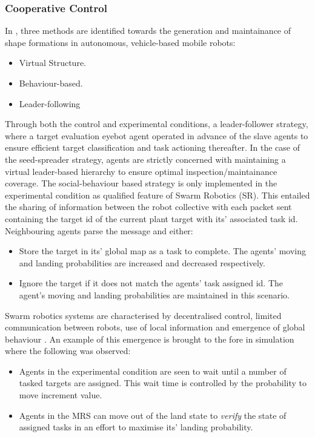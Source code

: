\documentclass{report}
\begin{document}
\subsubsection{Cooperative Control}
In \cite{Macas2009}, three methods are identified towards the generation and maintainance of shape formations in autonomous, vehicle-based mobile robots:
\begin{itemize}
	\item Virtual Structure.
	\item Behaviour-based.
	\item Leader-following
\end{itemize}
Through both the control and experimental conditions, a leader-follower strategy, where a target evaluation eyebot agent operated in advance of the slave agents to ensure efficient target classification and task actioning thereafter. In the case of the seed-spreader strategy, agents are strictly concerned with maintaining a virtual leader-based hierarchy to ensure optimal inspection/maintainance coverage. The social-behaviour based strategy is only implemented in the experimental condition as qualified feature of Swarm Robotics (SR). This entailed the sharing of information between the robot collective with each packet sent containing the target id of the current plant target with its' associated task id. Neighbouring agents parse the message and either:

\begin{itemize}
	\item Store the target in its' global map as a task to complete. The agents' moving and landing probabilities are increased and decreased respectively.
	\item Ignore the target if it does not match the agents' task assigned id. The agent's moving and landing probabilities are maintained in this scenario.
\end{itemize}

Swarm robotics systems are characterised by decentralised control, limited communication between robots, use of local information and emergence of global behaviour \cite{Dorigo2013}. An example of this emergence is brought to the fore in simulation where the following was observed:
\begin{itemize}
	\item Agents in the experimental condition are seen to wait until a number of tasked targets are assigned. This wait time is controlled by the probability to move increment value.
	\item Agents in the MRS can move out of the land state to \textit{verify} the state of assigned tasks in an effort to maximise its' landing probability.
\end{itemize}
\end{document}
